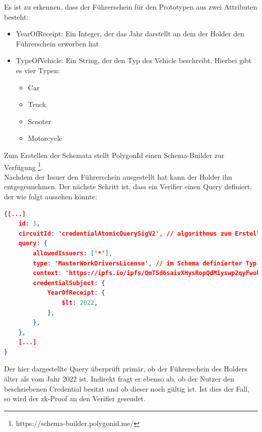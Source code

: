 Es ist zu erkennen, dass der Führerschein für den Prototypen aus zwei Attributen besteht:
\begin{itemize}
	\item YearOfReceipt: Ein Integer, der das Jahr darstellt an dem der Holder den Führerschein erworben hat
	\item TypeOfVehicle: Ein String, der den Typ des Vehicle beschreibt. Hierbei gibt es vier Typen: 
	
	\begin{itemize}
		\item Car
		\item Truck
		\item Scooter
		\item Motorcycle
	\end{itemize}
\end{itemize}

Zum Erstellen der Schemata stellt PolygonId einen Schema-Builder zur Verfügung \footnote{https://schema-builder.polygonid.me/}. \\
Nachdem der Issuer den Führerschein ausgestellt hat kann der Holder ihn entgegennehmen. Der nächste Schritt ist, dass ein Verifier einen Query definiert, der wie folgt aussehen könnte:
\begin{lstlisting}[language=json,firstnumber=1]
{[...]
	id: 1,
	circuitId: 'credentialAtomicQuerySigV2', // algorithmus zum Erstellen des zk-Proofs
	query: {
		allowedIssuers: ['*'],
		type: 'MasterWorkDriversLicense', // im Schema definierter Typ
		context: 'https://ipfs.io/ipfs/QmTSd6saivXHysRopQdM1yswp2qyFwobL7fwuFpkVTS8gd',
		credentialSubject: {
			YearOfReceipt: {
				$lt: 2022,
			},
		},
	},
	[...]
}
\end{lstlisting}
Der hier dargestellte Query überprüft primär, ob der Führerschein des Holders älter als vom Jahr 2022 ist. Indirekt fragt er ebenso ab, ob der Nutzer den beschriebenen Credential besitzt und ob dieser noch gültig ist. Ist dies der Fall, so wird der zk-Proof an den Verifier gesendet.

